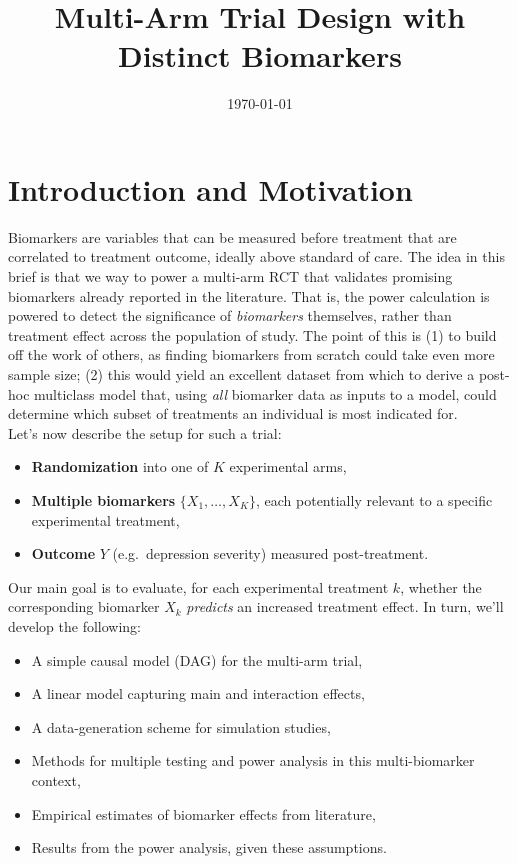 \documentclass[11pt]{article}
\begin{document}
\title{Multi-Arm Trial Design with Distinct Biomarkers}
\author{}
\date{\today}
\maketitle

\section{Introduction and Motivation}

Biomarkers are variables that can be measured before treatment that are correlated to treatment outcome, ideally above standard of care. The idea in this brief is that we way to power a multi-arm RCT that validates promising biomarkers already reported in the literature. That is, the power calculation is powered to detect the significance of {\it biomarkers} themselves, rather than treatment effect across the population of study. The point of this is (1) to build off the work of others, as finding biomarkers from scratch could take even more sample size; (2) this would yield an excellent dataset from which to derive a post-hoc multiclass model that, using {\it all} biomarker data as inputs to a model, could determine which subset of treatments an individual is most indicated for.
\ \\

Let's now describe the setup for such a trial:

\begin{itemize}
\item \textbf{Randomization} into one of \(K\) experimental arms,
\item \textbf{Multiple biomarkers} \(\{X_1, \dots, X_K\}\), each potentially relevant to a specific experimental treatment,
\item \textbf{Outcome} \(Y\) (e.g.\ depression severity) measured post-treatment.
\end{itemize}

Our main goal is to evaluate, for each experimental treatment \(k\), whether the corresponding biomarker \(X_k\) \emph{predicts} an increased treatment effect. In turn, we'll develop the following:
\begin{itemize}
\item A simple causal model (DAG) for the multi-arm trial,
\item A linear model capturing main and interaction effects,
\item A data-generation scheme for simulation studies,
\item Methods for multiple testing and power analysis in this multi-biomarker context,
\item Empirical estimates of biomarker effects from literature,
\item Results from the power analysis, given these assumptions.
\end{itemize}
\end{document}
